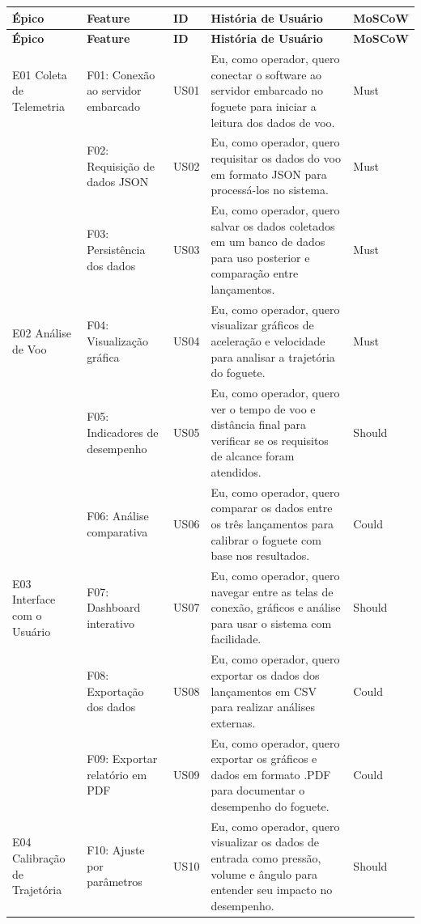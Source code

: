 \begin{longtable}{|>{\centering\arraybackslash}m{2cm}|
                    >{\centering\arraybackslash}m{2.7cm}|
                    >{\centering\arraybackslash}m{1cm}|
                    >{\centering\arraybackslash}m{6cm}|
                    >{\centering\arraybackslash}m{2cm}|}
  \hline
  \textbf{Épico} & \textbf{Feature} & \textbf{ID} & \textbf{História de Usuário} & \textbf{MoSCoW} \\
  \hline
  \endfirsthead
  
  \hline
  \textbf{Épico} & \textbf{Feature} & \textbf{ID} & \textbf{História de Usuário} & \textbf{MoSCoW} \\
  \hline
  \endhead

E01 Coleta de Telemetria
    & F01: Conexão ao servidor embarcado & US01 & Eu, como operador, quero conectar o software ao servidor embarcado no foguete para iniciar a leitura dos dados de voo. & Must \\
  \cline{2-5}
    & F02: Requisição de dados JSON & US02 & Eu, como operador, quero requisitar os dados do voo em formato JSON para processá-los no sistema. & Must \\
  \cline{2-5}
    & F03: Persistência dos dados & US03 & Eu, como operador, quero salvar os dados coletados em um banco de dados para uso posterior e comparação entre lançamentos. & Must \\
  \hline

E02 Análise de Voo
    & F04: Visualização gráfica & US04 & Eu, como operador, quero visualizar gráficos de aceleração e velocidade para analisar a trajetória do foguete. & Must \\
  \cline{2-5}
    & F05: Indicadores de desempenho & US05 & Eu, como operador, quero ver o tempo de voo e distância final para verificar se os requisitos de alcance foram atendidos. & Should \\
  \cline{2-5}
    & F06: Análise comparativa & US06 & Eu, como operador, quero comparar os dados entre os três lançamentos para calibrar o foguete com base nos resultados. & Could \\
  \hline

E03 Interface com o Usuário
    & F07: Dashboard interativo & US07 & Eu, como operador, quero navegar entre as telas de conexão, gráficos e análise para usar o sistema com facilidade. & Should \\
  \cline{2-5}
    & F08: Exportação dos dados & US08 & Eu, como operador, quero exportar os dados dos lançamentos em CSV para realizar análises externas. & Could \\
  \cline{2-5}
    & F09: Exportar relatório em PDF & US09 & Eu, como operador, quero exportar os gráficos e dados em formato .PDF para documentar o desempenho do foguete. & Could \\
  \hline

E04 Calibração de Trajetória
    & F10: Ajuste por parâmetros & US10 & Eu, como operador, quero visualizar os dados de entrada como pressão, volume e ângulo para entender seu impacto no desempenho. & Should \\
  \hline

\end{longtable}


